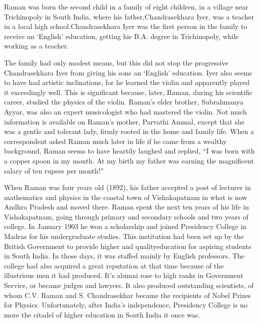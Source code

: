 \noindent
Raman was born the second child in a family of eight children, in a village near Trichinopoly in South India, where his father,\break \hbox{Chandrasekhara} Iyer, was a teacher in a local high school.\break \hbox{Chandrasekhara} Iyer was the first person in the family to receive an `English' education, getting his B.A. degree in Trichinopoly, while working as a teacher.

The family had only modest means, but this did not stop the progressive Chandrasekhara Iyer from giving his sons an `English' education. Iyer also seems to have had artistic inclinations, for he learned the violin and apparently played it exceedingly well. This is significant because, later, Raman, during his scientific career, studied the physics of the violin. Raman's elder brother, Subrahmanya Ayyar, was also an expert musicologist who had mastered the violin. Not much information is available on Raman's mother, Parvathi \hbox{Ammal}, except that she was a gentle and tolerant lady, firmly rooted in the home and family life. When a correspondent asked Raman much later in life if he came from a wealthy background, Raman seems to have heartily laughed and replied, ``I was born with a copper spoon in my mouth. At my birth my father was earning the magnificent salary of ten rupees per month!''

When Raman was four years old (1892), his father accepted a post of lecturer in mathematics and physics in the coastal town of Vishakapatnam in what is now Andhra Pradesh and moved there. Raman spent the next ten years of his life in Vishakapatnam, going through primary and secondary schools and two years of college. In January 1903 he won a scholarship and joined Presidency College in Madras for his undergraduate studies. This institution had been set up by the British Government to provide higher and quality\break education for aspiring students in South India. In those days, it was staffed mainly by English professors. The college had also acquired a great reputation at that time because of the illustrious men it had produced. It's alumni rose to high ranks in Government Service, or became judges and lawyers. It also produced outstanding scientists, of whom C.V. Raman and S. Chandrasekhar became the recipients of Nobel Prizes for Physics. Unfortunately, after India's independence, Presidency College is no more the citadel of higher education in South India it once was.

